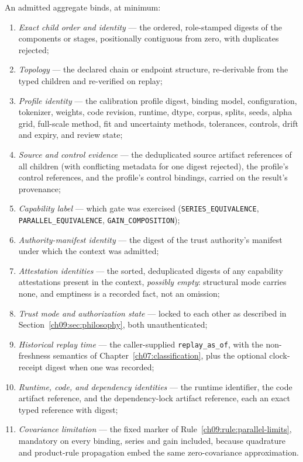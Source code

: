 \begin{definition}\label{ch09:def:binding}
An admitted aggregate binds, at minimum:
\begin{enumerate}
\item \emph{Exact child order and identity} --- the ordered, role-stamped
digests of the components or stages, positionally contiguous from zero,
with duplicates rejected;
\item \emph{Topology} --- the declared chain or endpoint structure,
re-derivable from the typed children and re-verified on replay;
\item \emph{Profile identity} --- the calibration profile digest, binding
model, configuration, tokenizer, weights, code revision, runtime, dtype,
corpus, splits, seeds, alpha grid, full-scale method, fit and uncertainty
methods, tolerances, controls, drift and expiry, and review state;
\item \emph{Source and control evidence} --- the deduplicated source
artifact references of all children (with conflicting metadata for one
digest rejected), the profile's control references, and the profile's
control bindings, carried on the result's provenance;
\item \emph{Capability label} --- which gate was exercised
(\texttt{SERIES\_EQUIVALENCE}, \texttt{PARALLEL\_EQUIVALENCE},
\texttt{GAIN\_COMPOSITION});
\item \emph{Authority-manifest identity} --- the digest of the trust
authority's manifest under which the context was admitted;
\item \emph{Attestation identities} --- the sorted, deduplicated digests
of any capability attestations present in the context, \emph{possibly
empty}: structural mode carries none, and emptiness is a recorded fact,
not an omission;
\item \emph{Trust mode and authorization state} --- locked to each other
as described in Section~\ref{ch09:sec:philosophy}, both unauthenticated;
\item \emph{Historical replay time} --- the caller-supplied
\texttt{replay\_as\_of}, with the non-freshness semantics of
Chapter~\ref{ch07:classification}, plus the optional clock-receipt digest
when one was recorded;
\item \emph{Runtime, code, and dependency identities} --- the runtime
identifier, the code artifact reference, and the dependency-lock artifact
reference, each an exact typed reference with digest;
\item \emph{Covariance limitation} --- the fixed marker of
Rule~\ref{ch09:rule:parallel-limits}, mandatory on every binding, series
and gain included, because quadrature and product-rule propagation embed
the same zero-covariance approximation.
\end{enumerate}
\end{definition}


